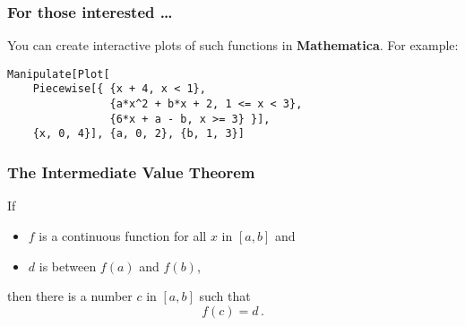 \documentclass[10pt,t,presentation,ignorenonframetext,aspectratio=169]{beamer}
\begin{document}
\begin{frame}[fragile]
  \frametitle{For those interested \ldots}
  You can create interactive plots of such functions in
  \textbf{Mathematica}. For example:


  \begin{tcolorbox}
    \vspace{-0mm}
    \begin{lstlisting}[numbers=none,frame=none,basicstyle=\ttfamily]
Manipulate[Plot[
    Piecewise[{ {x + 4, x < 1},
                {a*x^2 + b*x + 2, 1 <= x < 3},
                {6*x + a - b, x >= 3} }],
    {x, 0, 4}], {a, 0, 2}, {b, 1, 3}]
    \end{lstlisting}
  \end{tcolorbox}
\end{frame}

\begin{frame}
  \frametitle{The Intermediate Value Theorem}
  \begin{thm}
    If
    \begin{itemize}
    \item $f$ is a continuous function for all $x$ in $[a,b]$ and
    \item $d$ is between $f(a)$ and $f(b)$,
    \end{itemize}
    then there is a number $c$ in $[a,b]$ such that
    \[
      f(c) = d \,.
    \]
  \end{thm}
\end{frame}
\end{document}
